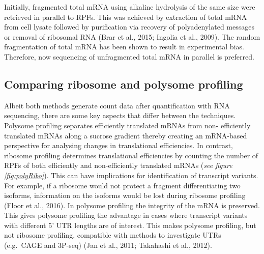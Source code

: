 \documentclass[
  12pt,
  openany]{book}
\begin{document}
Initially, fragmented total mRNA using alkaline hydrolysis of the same size were retrieved in parallel to RPFs. This was achieved by extraction of total mRNA from cell lysate followed by purification via recovery of polyadenylated messages or removal of ribosomal RNA (Brar et al., 2015; Ingolia et al., 2009). The random fragmentation of total mRNA has been shown to result in experimental bias. Therefore, now sequencing of unfragmented total mRNA in parallel is preferred.

\subsection{Comparing ribosome and polysome profiling}

Albeit both methods generate count data after quantification with RNA sequencing, there are some key aspects that differ between the techniques. Polysome profiling separates efficiently translated mRNAs from non- efficiently translated mRNAs along a sucrose gradient thereby creating an mRNA-based perspective for analysing changes in translational efficiencies. In contrast, ribosome profiling determines translational efficiencies by counting the number of RPFs of both efficiently and non-efficiently translated mRNAs (\emph{see figure \ref{fig:polyRibo}}). This can have implications for identification of transcript variants. For example, if a ribosome would not protect a fragment differentiating two isoforms, information on the isoforms would be lost during ribosome profiling (Floor et al., 2016). In polysome profiling the integrity of the mRNA is preserved. This gives polysome profiling the advantage in cases where transcript variants with different 5' UTR lengths are of interest. This makes polysome profiling, but not ribosome profiling, compatible with methods to investigate UTRs (e.g.~CAGE and 3P-seq) (Jan et al., 2011; Takahashi et al., 2012).
\end{document}
